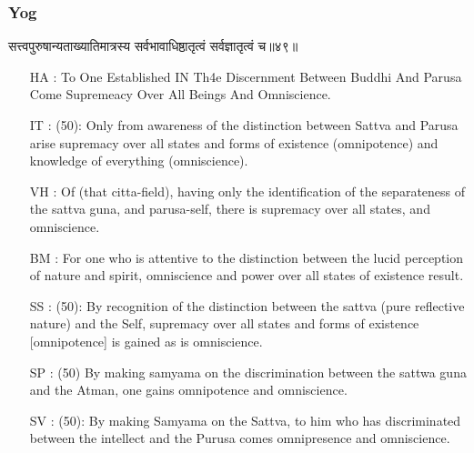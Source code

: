 \begin{frame}[fragile]\frametitle{Yog}
\begin{sanskrit}
सत्त्वपुरुषान्यताख्यातिमात्रस्य सर्वभावाधिष्ठातृत्वं सर्वज्ञातृत्वं च॥४९॥
\end{sanskrit}

	\begin{itemize}
	\item [HA]: To One Established IN Th4e Discernment Between Buddhi And Parusa Come Supremeacy Over All Beings And Omniscience.
	\item [IT]: (50): Only from awareness of the distinction between Sattva and Parusa arise supremacy over all states and forms of existence (omnipotence) and knowledge of everything (omniscience).
	\item [VH]: Of (that citta-field), having only the identification of the separateness of the sattva guna, and parusa-self, there is supremacy over all states, and omniscience.
	\item [BM]: For one who is attentive to the distinction between the lucid perception of nature and spirit, omniscience and power over all states of existence result.
	\item [SS]: (50): By recognition of the distinction between the sattva (pure reflective nature) and the Self, supremacy over all states and forms of existence [omnipotence] is gained as is omniscience.
	\item [SP]: (50) By making samyama on the discrimination between the sattwa guna and the Atman, one gains omnipotence and omniscience.
	\item [SV]: (50): By making Samyama on the Sattva, to him who has discriminated between the intellect and the Purusa comes omnipresence and omniscience. 
	\end{itemize}
\end{frame}


